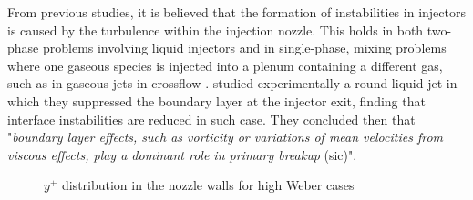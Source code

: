 From previous studies, it is believed that the formation of instabilities in injectors is caused by the turbulence within the injection nozzle. This holds in both two-phase problems involving liquid injectors 
and in single-phase, mixing problems where one gaseous species is injected into a plenum containing a different gas, such as in gaseous jets in crossflow . \citeColor[wu_effects_1994] studied experimentally a round liquid jet in which they suppressed the boundary layer at the injector exit, finding that interface instabilities are reduced in such case. They concluded then that "\textsl{boundary layer effects, such as vorticity or variations of mean velocities from viscous effects, play a dominant role in primary breakup} (sic)".

\begin{figure}[ht]
\centering
{}
\caption{$y^+$ distribution in the nozzle walls for high Weber cases}
\label{fig:injector_visualization_y_plus}
\end{figure}


